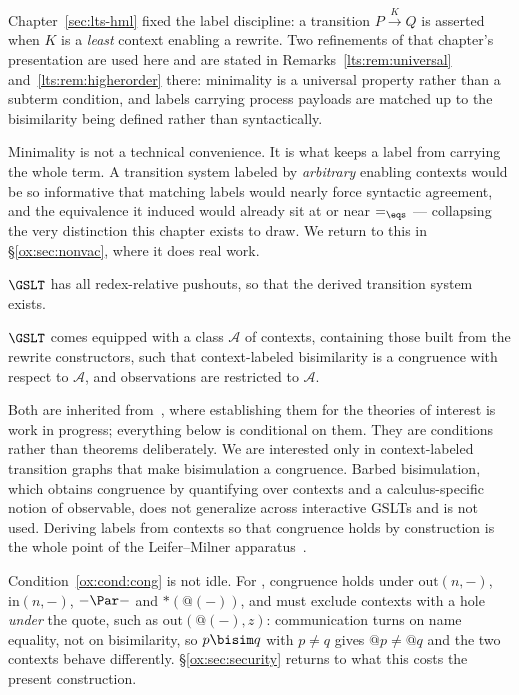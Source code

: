 Chapter~\ref{sec:lts-hml} fixed the label discipline: a transition
$P \xrightarrow{K} Q$ is asserted when $K$ is a \emph{least} context enabling a
rewrite. Two refinements of that chapter's presentation are used here and are
stated in Remarks~\ref{lts:rem:universal} and~\ref{lts:rem:higherorder} there:
minimality is a universal property rather than a subterm condition, and labels
carrying process payloads are matched up to the bisimilarity being defined rather
than syntactically.

Minimality is not a technical convenience. It is what keeps a label from carrying
the whole term. A transition system labeled by \emph{arbitrary} enabling contexts
would be so informative that matching labels would nearly force syntactic
agreement, and the equivalence it induced would already sit at or near $=_{\eqs}$
--- collapsing the very distinction this chapter exists to draw. We return to this
in \S\ref{ox:sec:nonvac}, where it does real work.

\begin{condition}
\label{ox:cond:rpo}
$\GSLT$ has all redex-relative pushouts, so that the derived transition system
exists.
\end{condition}

\begin{condition}[Congruence]
\label{ox:cond:cong}
$\GSLT$ comes equipped with a class $\mathcal{A}$ of contexts, containing those
built from the rewrite constructors, such that context-labeled bisimilarity is a
congruence with respect to $\mathcal{A}$, and observations are restricted to
$\mathcal{A}$.
\end{condition}

Both are inherited from~\cite{BIHOL}, where establishing them for the theories of
interest is work in progress; everything below is conditional on them. They are
conditions rather than theorems deliberately. We are interested only in
context-labeled transition graphs that make bisimulation a congruence. Barbed
bisimulation, which obtains congruence by quantifying over contexts and a
calculus-specific notion of observable, does not generalize across interactive
GSLTs and is not used. Deriving labels from contexts so that congruence holds by
construction is the whole point of the Leifer--Milner
apparatus~\cite{leifer2000deriving}.

Condition~\ref{ox:cond:cong} is not idle. For \rhoc, congruence holds under
$\mathrm{out}(n,-)$, $\mathrm{in}(n,-)$, $-\Par-$ and $\ast(@(-))$, and must
exclude contexts with a hole \emph{under} the quote, such as
$\mathrm{out}(@(-),z)$: communication turns on name equality, not on
bisimilarity, so $p \bisim q$ with $p \neq q$ gives $@p \neq @q$ and the two
contexts behave differently. \S\ref{ox:sec:security} returns to what this costs
the present construction.

